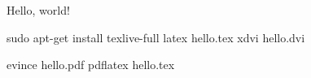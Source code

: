 \documentclass{article}
\begin{document}
Hello, world!

sudo apt-get install texlive-full
latex hello.tex
xdvi hello.dvi

evince hello.pdf
pdflatex hello.tex
\end{document}
